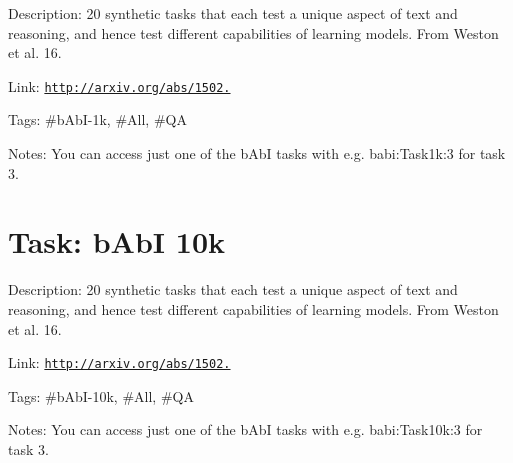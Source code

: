 Description\+: 20 synthetic tasks that each test a unique aspect of text and reasoning, and hence test different capabilities of learning models. From Weston et al. \textquotesingle{}16.

Link\+: \href{http://arxiv.org/abs/1502.05698}{\tt http\+://arxiv.\+org/abs/1502.}

Tags\+: \#b\+AbI-\/1k, \#\+All, \#\+QA

Notes\+: You can access just one of the b\+AbI tasks with e.\+g. \textquotesingle{}babi\+:\+Task1k\+:3\textquotesingle{} for task 3.

\section*{Task\+: b\+AbI 10k }

Description\+: 20 synthetic tasks that each test a unique aspect of text and reasoning, and hence test different capabilities of learning models. From Weston et al. \textquotesingle{}16.

Link\+: \href{http://arxiv.org/abs/1502.05698}{\tt http\+://arxiv.\+org/abs/1502.}

Tags\+: \#b\+AbI-\/10k, \#\+All, \#\+QA

Notes\+: You can access just one of the b\+AbI tasks with e.\+g. \textquotesingle{}babi\+:\+Task10k\+:3\textquotesingle{} for task 3. 
